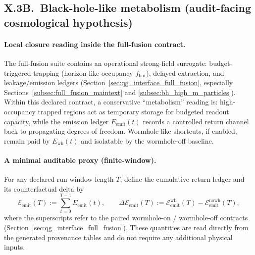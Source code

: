 \subsection{X.3B.\ Black-hole-like metabolism (audit-facing cosmological hypothesis)}
\label{subsec:x3b_black_hole_metabolism_audit_hypothesis}

\paragraph{Local closure reading inside the full-fusion contract.}
\AuditTag The full-fusion suite contains an operational strong-field surrogate:
budget-triggered trapping (horizon-like occupancy $f_{\mathrm{hor}}$), delayed extraction, and leakage/emission ledgers
(Section~\ref{sec:qg_interface_full_fusion}, especially Sections~\ref{subsec:full_fusion_maintext} and \ref{subsec:bh_high_m_particles}).
Within this declared contract, a conservative ``metabolism'' reading is:
high-occupancy trapped regions act as temporary storage for budgeted readout capacity, while the emission ledger $E_{\mathrm{emit}}(t)$ records a controlled return channel back to propagating degrees of freedom.
Wormhole-like shortcuts, if enabled, remain paid by $E_{\mathrm{wh}}(t)$ and isolatable by the wormhole-off baseline.

\paragraph{A minimal auditable proxy (finite-window).}
\AuditTag For any declared run window length $T$, define the cumulative return ledger and its counterfactual delta by
\[
\mathcal{E}_{\mathrm{emit}}(T):=\sum_{t=0}^{T-1}E_{\mathrm{emit}}(t),
\qquad
\Delta\mathcal{E}_{\mathrm{emit}}(T):=\mathcal{E}_{\mathrm{emit}}^{\mathrm{wh}}(T)-\mathcal{E}_{\mathrm{emit}}^{\mathrm{nowh}}(T),
\]
where the superscripts refer to the paired wormhole-on / wormhole-off contracts (Section~\ref{sec:qg_interface_full_fusion}).
These quantities are read directly from the generated provenance tables and do not require any additional physical inputs.

